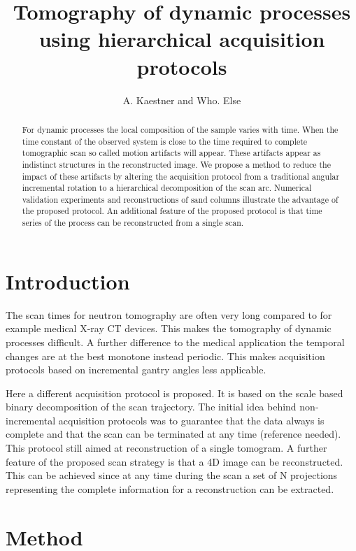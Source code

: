 \documentclass[a4paper,10pt]{scrartcl}
\title{Tomography of dynamic processes using hierarchical acquisition protocols}
\author{A. Kaestner and Who. Else}
\begin{document}
\maketitle

\begin{abstract}
For dynamic processes the local composition of the sample varies with time. When the time constant of the observed system is close to the time required to complete tomographic scan so called motion artifacts will appear. These artifacts appear as indistinct structures in the reconstructed image. We propose a method to reduce the impact of these artifacts by altering the acquisition protocol from a traditional angular incremental rotation to a hierarchical decomposition of the scan arc.
Numerical validation experiments and reconstructions of sand columns illustrate the advantage of the proposed protocol. An additional feature of the proposed protocol is that time series of the process can be reconstructed from a single scan.
\end{abstract}

\section{Introduction}
The scan times for neutron tomography are often very long compared to for example medical X-ray CT devices. This makes the tomography of dynamic processes difficult. A further difference to the medical application the temporal changes are at the best monotone instead periodic. This makes acquisition protocols based on incremental gantry angles less applicable\cite{li2006}.

Here a different acquisition protocol is proposed. It is based on the scale based binary decomposition of the scan trajectory.
The initial idea behind non-incremental acquisition protocols was to guarantee that the data always is complete and that the scan can be terminated at any time (reference needed). This protocol still aimed at reconstruction of a single tomogram.
A further feature of the proposed scan strategy is that a 4D image can be reconstructed. This can be achieved since at any time during the scan a set of N projections representing the complete information for a reconstruction can be extracted.

\section{Method}
\end{document}
